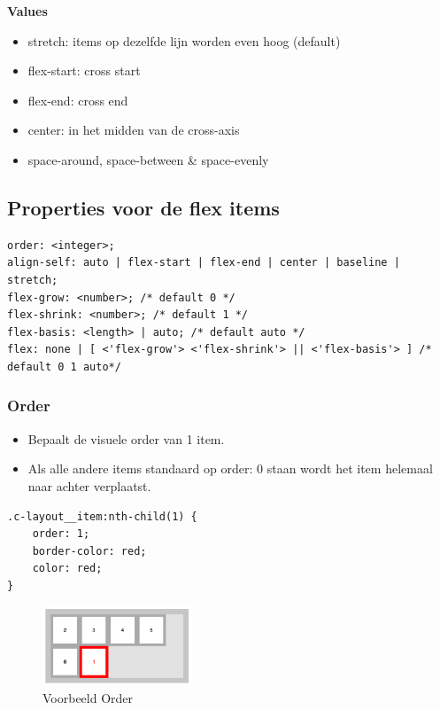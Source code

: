 \documentclass{article}
\newcommand{\bold}[1]{\textbf{#1}}
\begin{document}
\bold{Values}
\begin{itemize}
    \item stretch: items op dezelfde lijn worden even hoog (default)
    \item flex-start: cross start
    \item flex-end: cross end
    \item center: in het midden van de cross-axis
    \item space-around, space-between \& space-evenly
\end{itemize}

\subsection{Properties voor de flex items}
\begin{lstlisting}
order: <integer>;
align-self: auto | flex-start | flex-end | center | baseline |
stretch;
flex-grow: <number>; /* default 0 */
flex-shrink: <number>; /* default 1 */
flex-basis: <length> | auto; /* default auto */
flex: none | [ <'flex-grow'> <'flex-shrink'> || <'flex-basis'> ] /*
default 0 1 auto*/
\end{lstlisting}

\subsubsection{Order}
\begin{itemize}
    \item Bepaalt de visuele order van 1 item.
    \item Als alle andere items standaard op order: 0 staan wordt het item helemaal naar achter verplaatst.
\end{itemize}

\begin{lstlisting}
.c-layout__item:nth-child(1) {
    order: 1;
    border-color: red;
    color: red;
}
\end{lstlisting}

\begin{figure}[H]
    \centering
    \includegraphics[width=0.4\textwidth]{img/Screenshot_20200427_095803.png}
    \caption{Voorbeeld Order}
\end{figure}
\end{document}
